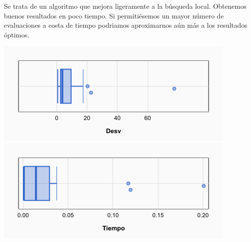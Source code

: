 \documentclass[a4paper, 12pt]{article}
\begin{document}
	Se trata de un algoritmo que mejora ligeramente a la búsqueda local. Obtenemos buenos resultados en poco tiempo. Si permitiésemos un mayor número de evaluaciones a costa de tiempo podriamos aproximarnos aún más a los resultados óptimos.

	\begin{center}
         \includegraphics[scale=0.5]{desv-ils}
         \includegraphics[scale=0.5]{time-ils}
      \end{center}

      
      \newpage
\end{document}

